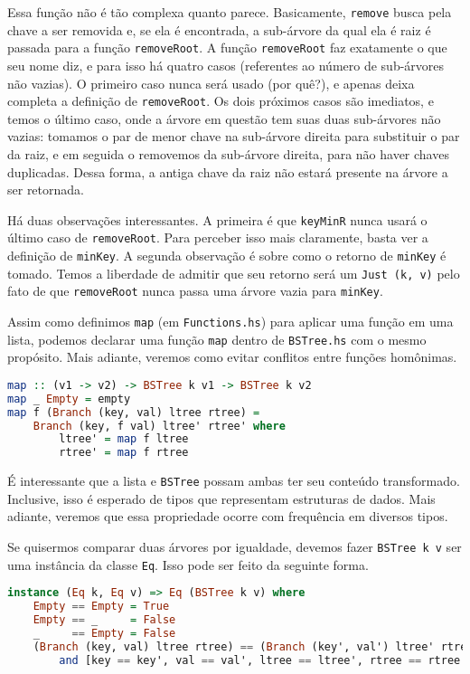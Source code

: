 \documentclass[a4paper]{article}
\begin{document}
Essa função não é tão complexa quanto parece.
Basicamente, \texttt{remove} busca pela chave a ser removida e, se ela é encontrada, a sub-árvore da qual ela é raiz é passada para a função \texttt{removeRoot}.
A função \texttt{removeRoot} faz exatamente o que seu nome diz, e para isso há quatro casos (referentes ao número de sub-árvores não vazias).
O primeiro caso nunca será usado (por quê?), e apenas deixa completa a definição de \texttt{removeRoot}.
Os dois próximos casos são imediatos, e temos o último caso, onde a árvore em questão tem suas duas sub-árvores não vazias: tomamos o par de menor chave na sub-árvore direita para substituir o par da raiz, e em seguida o removemos da sub-árvore direita, para não haver chaves duplicadas.
Dessa forma, a antiga chave da raiz não estará presente na árvore a ser retornada.

Há duas observações interessantes.
A primeira é que \texttt{keyMinR} nunca usará o último caso de \texttt{removeRoot}.
Para perceber isso mais claramente, basta ver a definição de \texttt{minKey}.
A segunda observação é sobre como o retorno de \texttt{minKey} é tomado.
Temos a liberdade de admitir que seu retorno será um \texttt{Just (k, v)} pelo fato de que \texttt{removeRoot} nunca passa uma árvore vazia para \texttt{minKey}.

Assim como definimos \texttt{map} (em \texttt{Functions.hs}) para aplicar uma função em uma lista, podemos declarar uma função \texttt{map} dentro de \texttt{BSTree.hs} com o mesmo propósito.
Mais adiante, veremos como evitar conflitos entre funções homônimas.

\begin{lstlisting}[language=haskell, frame=single]
map :: (v1 -> v2) -> BSTree k v1 -> BSTree k v2
map _ Empty = empty
map f (Branch (key, val) ltree rtree) =
	Branch (key, f val) ltree' rtree' where
		ltree' = map f ltree
		rtree' = map f rtree
\end{lstlisting}

É interessante que a lista e \texttt{BSTree} possam ambas ter seu conteúdo transformado.
Inclusive, isso é esperado de tipos que representam estruturas de dados.
Mais adiante, veremos que essa propriedade ocorre com frequência em diversos tipos.

Se quisermos comparar duas árvores por igualdade, devemos fazer \texttt{BSTree k v} ser uma instância da classe \texttt{Eq}.
Isso pode ser feito da seguinte forma.

\begin{lstlisting}[language=haskell, frame=single]
instance (Eq k, Eq v) => Eq (BSTree k v) where
	Empty == Empty = True
	Empty == _     = False
	_     == Empty = False
	(Branch (key, val) ltree rtree) == (Branch (key', val') ltree' rtree') =
		and [key == key', val == val', ltree == ltree', rtree == rtree']
\end{lstlisting}
\end{document}
